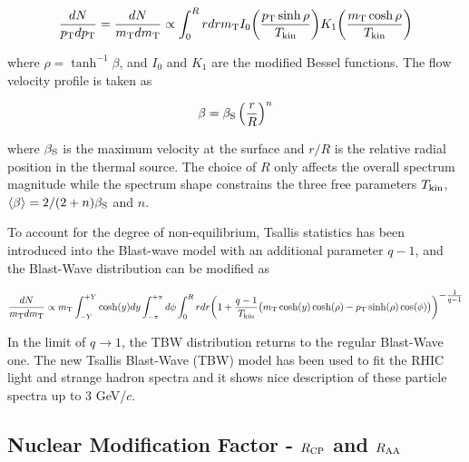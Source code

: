 \begin{equation}
\frac{dN}{p_{\rm T}dp_{\rm T}} = \frac{dN}{m_{\rm T}dm_{\rm T}} \propto \int_0^R rdr m_{\rm T} I_0\bigg(\frac{p_{\rm T}\sinh\rho}{T_{\rm kin}}\bigg) K_1\bigg(\frac{m_{\rm T}\cosh\rho}{T_{\rm kin}}\bigg)
\end{equation}

where $\rho = \tanh^{-1}\beta$, and $I_0$ and $K_1$ are the modified Bessel functions. The flow velocity profile is taken as

\begin{equation}
\beta = \beta_{\rm S}\left(\frac{r}{R}\right)^{n}
\end{equation}

where $\beta_{\rm S}$ is the maximum velocity at the surface and $r/R$ is the relative radial position in the thermal source. The choice of $R$ only affects the overall spectrum magnitude while the spectrum shape constrains the three free parameters $T_{\rm kin}$, $\langle\beta\rangle=2/(2+n)\beta_{\rm S}$ and $n$.


To account for the degree of non-equilibrium, Tsallis statistics has been introduced into the Blast-wave model with an additional parameter $q-1$, and the Blast-Wave distribution can be modified as

\begin{equation}
\frac{dN}{m_{\rm T}dm_{\rm T}} \propto m_{\rm T}\int_{-Y}^{+Y}\cosh(y)dy \int_{-\pi}^{+\pi} d\phi \int_0^R rdr \bigg(1+\frac{q-1}{T_{\rm kin}}\big(m_{\rm T}\cosh(y)\cosh(\rho)-p_{\rm T}\sinh(\rho)\cos(\phi)\big)\bigg)^{\textstyle -\frac{1}{q-1}}
\end{equation}

In the limit of $q\rightarrow 1$, the TBW distribution returns to the regular Blast-Wave one. The new Tsallis Blast-Wave (TBW) model has been used to fit the RHIC light and strange hadron spectra and it shows nice description of these particle spectra up to 3 GeV/$c$.



\subsection{\label{result:RCP}Nuclear Modification Factor - $R_{\rm CP}$ and  $R_{\rm AA}$}

